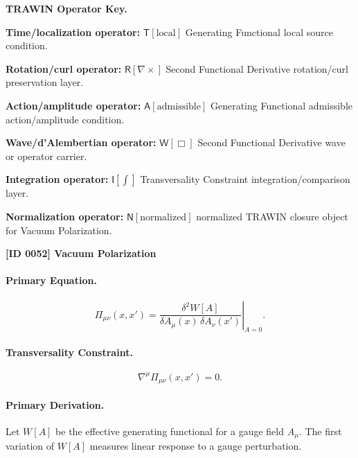 \par\vspace{0.45\baselineskip}
\noindent\begin{minipage}[t]{\linewidth}
\begingroup
\small
\raggedright
\textbf{TRAWIN Operator Key.}\par
\noindent\textbf{Time/localization operator:} $\mathsf{T}\!\left[\mathrm{local}\right]$ Generating Functional local source condition.\par
\noindent\textbf{Rotation/curl operator:} $\mathsf{R}\!\left[\nabla\times\right]$ Second Functional Derivative rotation/curl preservation layer.\par
\noindent\textbf{Action/amplitude operator:} $\mathsf{A}\!\left[\mathrm{admissible}\right]$ Generating Functional admissible action/amplitude condition.\par
\noindent\textbf{Wave/d'Alembertian operator:} $\mathsf{W}\!\left[\Box\right]$ Second Functional Derivative wave or operator carrier.\par
\noindent\textbf{Integration operator:} $\mathsf{I}\!\left[\int\right]$ Transversality Constraint integration/comparison layer.\par
\noindent\textbf{Normalization operator:} $\mathsf{N}\!\left[\mathrm{normalized}\right]$ normalized TRAWIN closure object for Vacuum Polarization.\par
\endgroup
\end{minipage}

\clearpage
\noindent\textbf{[ID 0052] Vacuum Polarization}\par
\vspace{0.35em}
\paragraph{Primary Equation.}
\begin{equation}
\Pi_{\mu\nu}(x,x')
=
\left.
\frac{\delta^2 W[A]}
{\delta A_\mu(x)\,\delta A_\nu(x')}
\right|_{A=0}.
\end{equation}

\paragraph{Transversality Constraint.}
\begin{equation}
\nabla^\mu \Pi_{\mu\nu}(x,x')=0 .
\end{equation}

\paragraph{Primary Derivation.}
Let $W[A]$ be the effective generating functional for a gauge field $A_\mu$.  
The first variation of $W[A]$ measures linear response to a gauge perturbation.

